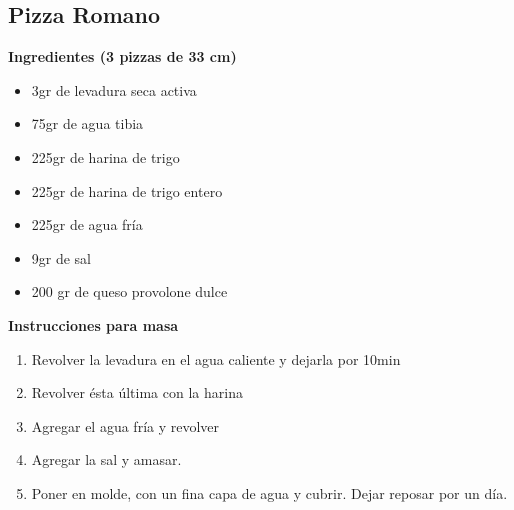 \subsection{Pizza Romano}

\textbf{Ingredientes (3 pizzas de 33 cm)}
\begin{itemize}
\item 3gr de levadura seca activa
\item 75gr de agua tibia
\item 225gr de harina de trigo
\item 225gr de harina de trigo entero
\item 225gr de agua fr\'ia
\item 9gr de sal
\item 200 gr de queso provolone dulce
\end{itemize}

\vspace{1cm}
\textbf{Instrucciones para masa}
\begin{enumerate}
\item Revolver la levadura en el agua caliente y dejarla por 10min
\item Revolver ésta \'ultima con la harina
\item Agregar el agua fr\'ia y revolver
\item Agregar la sal y amasar.
\item Poner en molde, con un fina capa de agua y cubrir. Dejar reposar por un día.
\end{enumerate} 

